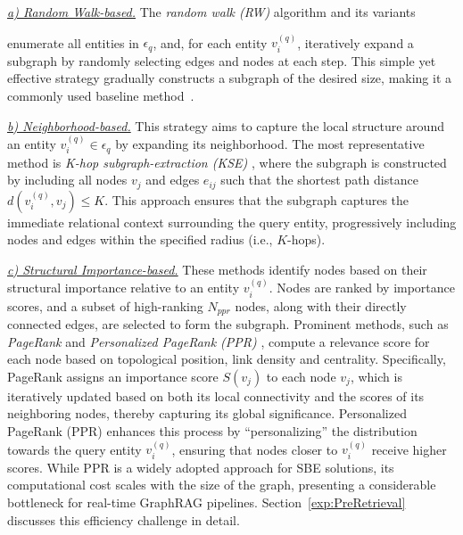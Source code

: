 {\it \underline{a) Random Walk-based.}} The {\it random walk (RW)} algorithm {\cite{RandomWalk,kRW}} and its variants {\cite{LRW,RWR,FastRWR,SecondRW,SpaceRW} enumerate all entities in $\epsilon_q$, and, for each entity $v_i^{(q)}$,
iteratively expand a subgraph by randomly selecting edges and nodes at each step. This simple yet effective strategy gradually constructs a subgraph of the desired size, making it a commonly used baseline method~\cite{NSM,RoG,LessIsMore,GCR}.

{\it \underline{b) Neighborhood-based.}} This strategy aims to capture the local structure around an entity \( v_i^{(q)}\in \epsilon_q \) by expanding its neighborhood. The most representative method is {\it K-hop subgraph-extraction (KSE)} {\cite{NSM}}, where the subgraph is constructed by including all nodes \( v_j \) and edges \( e_{ij} \) such that the shortest path distance \( d(v_i^{(q)}, v_j) \leq K \). 
This approach ensures that the subgraph captures the immediate relational context surrounding the query entity, progressively including nodes and edges within the specified radius (i.e., $K$-hops).



{\it \underline{c) Structural Importance-based.}} These methods  {\cite{PageRank,PPR,PPRSurvey}} identify nodes based on their structural importance relative to an entity \( v_i^{(q)} \). Nodes are ranked by importance scores, and a subset of high-ranking $N_{ppr}$ nodes, along with their directly connected edges, are selected to form the subgraph.
Prominent methods, such as {\it PageRank} {\cite{PageRank}} and {\it Personalized PageRank (PPR)} {\cite{PPR}}, compute a relevance score for each node based on topological position, link density and centrality.
Specifically, PageRank assigns an importance score \( S(v_j) \) to each node \( v_j \), which is iteratively updated based on both its local connectivity and the scores of its neighboring nodes, thereby capturing its global significance. Personalized PageRank (PPR) enhances this process by ``personalizing'' the distribution towards the query entity \( v_i^{(q)} \), ensuring that nodes closer to \( v_i^{(q)} \) receive higher scores.
While PPR is a widely adopted approach for SBE solutions, its computational cost scales with the size of the graph, presenting a considerable bottleneck for real-time GraphRAG pipelines. Section~\ref{exp:PreRetrieval} discusses this efficiency challenge in detail.




}
